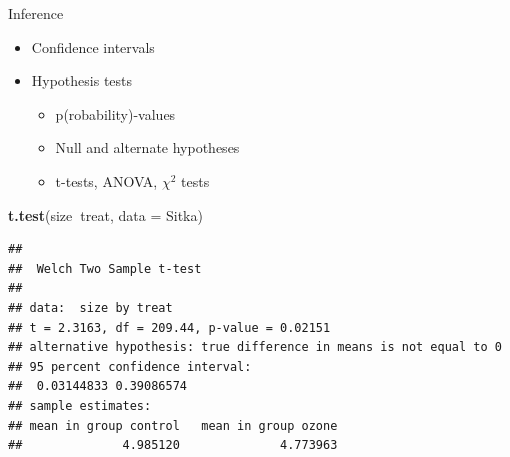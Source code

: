\documentclass[
  ignorenonframetext,
]{beamer}
\newenvironment{Shaded}{\begin{snugshade}}{\end{snugshade}}
\newcommand{\DataTypeTok}[1]{\textcolor[rgb]{0.13,0.29,0.53}{#1}}
\newcommand{\KeywordTok}[1]{\textcolor[rgb]{0.13,0.29,0.53}{\textbf{#1}}}
\newcommand{\NormalTok}[1]{#1}
\newcommand{\OperatorTok}[1]{\textcolor[rgb]{0.81,0.36,0.00}{\textbf{#1}}}
\providecommand{\tightlist}{%
  \setlength{\itemsep}{0pt}\setlength{\parskip}{0pt}}
\begin{document}
\begin{frame}[fragile]{Inference}
\protect\hypertarget{inference}{}

\begin{itemize}
\tightlist
\item
  Confidence intervals
\item
  Hypothesis tests

  \begin{itemize}
  \tightlist
  \item
    p(robability)-values
  \item
    Null and alternate hypotheses
  \item
    t-tests, ANOVA, \(\chi^2\) tests
  \end{itemize}
\end{itemize}

\footnotesize

\begin{Shaded}
\begin{Highlighting}[]
\KeywordTok{t.test}\NormalTok{(size}\OperatorTok{~}\NormalTok{treat, }\DataTypeTok{data =}\NormalTok{ Sitka)}
\end{Highlighting}
\end{Shaded}

\begin{verbatim}
## 
##  Welch Two Sample t-test
## 
## data:  size by treat
## t = 2.3163, df = 209.44, p-value = 0.02151
## alternative hypothesis: true difference in means is not equal to 0
## 95 percent confidence interval:
##  0.03144833 0.39086574
## sample estimates:
## mean in group control   mean in group ozone 
##              4.985120              4.773963
\end{verbatim}

\normalsize

\end{frame}
\end{document}
